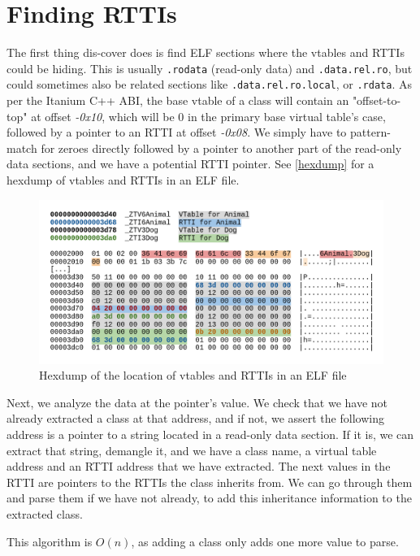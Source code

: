 \documentclass[a4paper,11pt,oneside]{report}
\begin{document}
\section{Finding RTTIs}

The first thing dis-cover does is find ELF sections where the vtables and RTTIs 
could be hiding.
This is usually \texttt{.rodata} (read-only data) and \texttt{.data.rel.ro}, 
but could sometimes also be related sections like \texttt{.data.rel.ro.local}, 
or \texttt{.rdata}.
As per the Itanium C++ ABI, the base vtable of a class will contain an 
"offset-to-top" at offset \emph{-0x10}, which will be 0 in the primary base 
virtual table's case, followed by a pointer to an RTTI at offset
\emph{-0x08}.
We simply have to pattern-match for zeroes directly followed by a pointer to 
another part of the read-only data sections, and we have a potential RTTI 
pointer. See \autoref{hexdump} for a hexdump of vtables and RTTIs in an ELF
file.

\begin{figure}

\includegraphics[width=16cm]{hexdump.png}
\caption{Hexdump of the location of vtables and RTTIs in an ELF file}
\label{hexdump}

\end{figure}

Next, we analyze the data at the pointer's value.
We check that we have not already extracted a class at that address, and if
not, we assert the following address is a pointer to a string located in a
read-only data section.
If it is, we can extract that string, demangle it, and we have a class name,
a virtual table address and an RTTI address that we have extracted.
The next values in the RTTI are pointers to the RTTIs the class inherits from.
We can go through them and parse them if we have not already, to add this 
inheritance information to the extracted class.

This algorithm is $O(n)$, as adding a class only adds one more value to parse.
\end{document}
